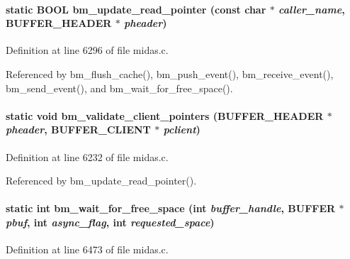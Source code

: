 \paragraph[{bm\_\-update\_\-read\_\-pointer}]{\setlength{\rightskip}{0pt plus 5cm}static {\bf BOOL} bm\_\-update\_\-read\_\-pointer (const char $\ast$ {\em caller\_\-name}, \/  {\bf BUFFER\_\-HEADER} $\ast$ {\em pheader})}\hfill\label{group__bmfunctionc_ga33415128fc3cfa10528fe85badc265ef}


Definition at line 6296 of file midas.c.

Referenced by bm\_\-flush\_\-cache(), bm\_\-push\_\-event(), bm\_\-receive\_\-event(), bm\_\-send\_\-event(), and bm\_\-wait\_\-for\_\-free\_\-space().
\paragraph[{bm\_\-validate\_\-client\_\-pointers}]{\setlength{\rightskip}{0pt plus 5cm}static void bm\_\-validate\_\-client\_\-pointers ({\bf BUFFER\_\-HEADER} $\ast$ {\em pheader}, \/  {\bf BUFFER\_\-CLIENT} $\ast$ {\em pclient})}\hfill\label{group__bmfunctionc_ga4cc39a5180ad4e716108d024f225c914}


Definition at line 6232 of file midas.c.

Referenced by bm\_\-update\_\-read\_\-pointer().
\paragraph[{bm\_\-wait\_\-for\_\-free\_\-space}]{\setlength{\rightskip}{0pt plus 5cm}static int bm\_\-wait\_\-for\_\-free\_\-space (int {\em buffer\_\-handle}, \/  {\bf BUFFER} $\ast$ {\em pbuf}, \/  int {\em async\_\-flag}, \/  int {\em requested\_\-space})}\hfill\label{group__bmfunctionc_ga8d40df6e065fc5111d5cce71d3d2bf5f}


Definition at line 6473 of file midas.c.

